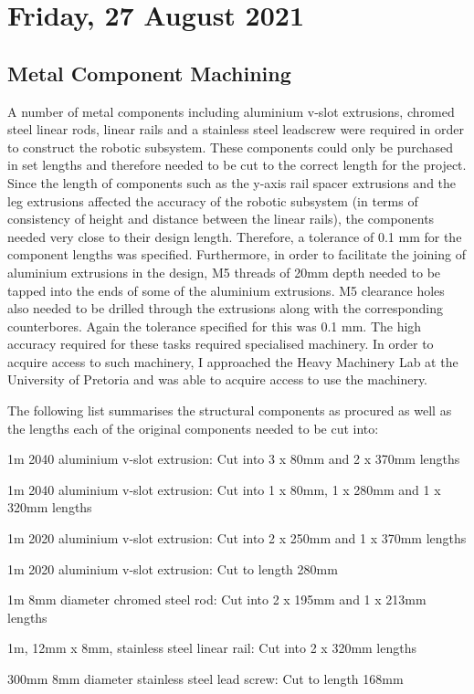 \pendsign

\section[2021/08/27]{Friday, 27 August 2021}

\subsection{Metal Component Machining}

 A number of metal components including aluminium v-slot extrusions, chromed steel linear rods, linear rails and a stainless steel leadscrew were required in order to construct the robotic subsystem. These components could only be purchased in set lengths and therefore needed to be cut to the correct length for the project. Since the length of components such as the y-axis rail spacer extrusions and the leg extrusions affected the accuracy of the robotic subsystem (in terms of consistency of height and distance between the linear rails), the components needed very close to their design length. Therefore, a tolerance of 0.1 mm for the component lengths was specified. Furthermore, in order to facilitate the joining of aluminium extrusions in the design, M5 threads of 20mm depth needed to be tapped into the ends of some of the aluminium extrusions. M5 clearance holes also needed to be drilled through the extrusions along with the corresponding counterbores. Again the tolerance specified for this was 0.1 mm. The high accuracy required for these tasks required specialised machinery. In order to acquire access to such machinery, I approached the Heavy Machinery Lab at the University of Pretoria and was able to acquire access to use the machinery.

The following list summarises the structural components as procured as well as the lengths each of the original components needed to be cut into:

\begin{compactitem}
	\item 1m 2040 aluminium v-slot extrusion: Cut into 3 x 80mm and 2 x 370mm lengths
	\item 1m 2040 aluminium v-slot extrusion: Cut into 1 x 80mm, 1 x 280mm and 1 x 320mm lengths
	\item 1m 2020 aluminium v-slot extrusion: Cut into 2 x 250mm and 1 x 370mm lengths
	\item 1m 2020 aluminium v-slot extrusion: Cut to length 280mm
	\item 1m 8mm diameter chromed steel rod: Cut into 2 x 195mm and 1 x 213mm lengths
	\item 1m, 12mm x 8mm, stainless steel linear rail: Cut into 2 x 320mm lengths
	\item 300mm 8mm diameter stainless steel lead screw: Cut to length 168mm
\end{compactitem}

